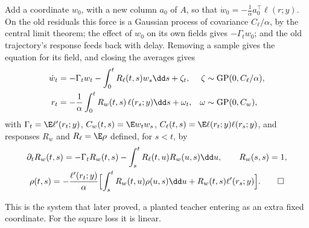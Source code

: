 \begin{refsection}
\begin{heuristic}
Add a coordinate $w_0$, with a new column $a_0$ of $A$, so that $\dot w_0=-\frac1\alpha a_0^\top\ell(r;y)$. On the old residuals this force is a Gaussian process of covariance $C_\ell/\alpha$, by the central limit theorem; the effect of $w_0$ on its own fields gives $-\Gamma_tw_0$; and the old trajectory's response feeds back with delay. Removing a sample gives the equation for its field, and closing the averages gives
\begin{equation}\label{eq:dmft:glm}
\begin{aligned}
\dot w_t&=-\Gamma_tw_t-\int_0^tR_\ell(t,s)w_s\dd s+\zeta_t,&\zeta&\sim\dmftGP(0,C_\ell/\alpha),\\
r_t&=-\frac1\alpha\int_0^tR_w(t,s)\,\ell(r_s;y)\dd s+\omega_t,&\omega&\sim\dmftGP(0,C_w),
\end{aligned}
\end{equation}
with $\Gamma_t=\E\ell'(r_t;y)$, $C_w(t,s)=\E w_tw_s$, $C_\ell(t,s)=\E\ell(r_t;y)\ell(r_s;y)$, and responses $R_w$ and $R_\ell=\E\rho$ defined, for $s<t$, by
\begin{gather*}
\partial_tR_w(t,s)=-\Gamma_tR_w(t,s)-\int_s^tR_\ell(t,u)R_w(u,s)\dd u,\qquad R_w(s,s)=1,\\
\rho(t,s)=-\frac{\ell'(r_t;y)}\alpha\Bigl[\int_s^tR_w(t,u)\rho(u,s)\dd u+R_w(t,s)\ell'(r_s;y)\Bigr].\qedhere
\end{gather*}
\end{heuristic}

This is the system that \textcite{CelentanoChengMontanari2021} later proved, a planted teacher entering as an extra fixed coordinate. For the square loss it is linear.


\end{refsection}
